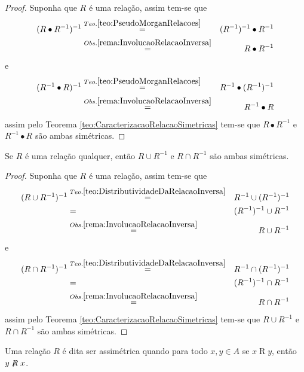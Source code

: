 \begin{proof}
	Suponha que $R$ é uma relação, assim tem-se que 
	\begin{eqnarray*}
		(R \bullet R^{-1})^{-1} & \stackrel{Teo. \ref{teo:PseudoMorganRelacoes}}{=} & (R^{-1})^{-1} \bullet R^{-1}\\
		&\stackrel{Obs. \ref{rema:InvolucaoRelacaoInversa}}{=}& R \bullet R^{-1}
	\end{eqnarray*}
	e
	\begin{eqnarray*}
		(R^{-1} \bullet R)^{-1} & \stackrel{Teo. \ref{teo:PseudoMorganRelacoes}}{=} &  R^{-1} \bullet (R^{-1})^{-1}\\
		&\stackrel{Obs. \ref{rema:InvolucaoRelacaoInversa}}{=}& R^{-1} \bullet R
	\end{eqnarray*}
	assim pelo Teorema \ref{teo:CaracterizacaoRelacaoSimetricas} tem-se que $R \bullet R^{-1}$ e  $R^{-1} \bullet R$ são ambas simétricas.
\end{proof}

\begin{theorem}
	Se $R$ é uma relação qualquer, então $R \cup R^{-1}$ e  $R \cap R^{-1}$ são ambas simétricas.
\end{theorem}

\begin{proof}
	Suponha que $R$ é uma relação, assim tem-se que 
	\begin{eqnarray*}
		(R \cup R^{-1})^{-1} & \stackrel{Teo. \ref{teo:DistributividadeDaRelacaoInversa}}{=} & R^{-1} \cup (R^{-1})^{-1}\\
		& = & (R^{-1})^{-1} \cup R^{-1}\\
		&\stackrel{Obs. \ref{rema:InvolucaoRelacaoInversa}}{=} & R \cup R^{-1}
	\end{eqnarray*}
	e
	\begin{eqnarray*}
		(R \cap R^{-1})^{-1} & \stackrel{Teo. \ref{teo:DistributividadeDaRelacaoInversa}}{=} & R^{-1} \cap (R^{-1})^{-1}\\
		& = & (R^{-1})^{-1} \cap R^{-1}\\
		&\stackrel{Obs. \ref{rema:InvolucaoRelacaoInversa}}{=} & R \cap R^{-1}
	\end{eqnarray*}
	assim pelo Teorema \ref{teo:CaracterizacaoRelacaoSimetricas} tem-se que $R \cup R^{-1}$ e  $R \cap R^{-1}$ são ambas simétricas.
\end{proof}

\begin{definition}\label{def:RelacaoAssimétrica}
	Uma relação $R$ é dita ser assimétrica quando para todo $x, y \in A$ se $x \mathrel{R} y$, então $y \centernot{R} x$.
\end{definition}

